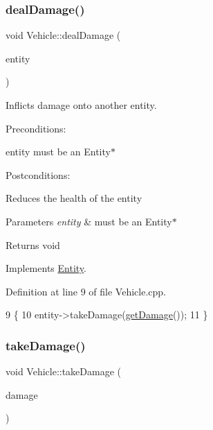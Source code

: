 \subsubsection{\texorpdfstring{deal\+Damage()}{dealDamage()}}
{\footnotesize\ttfamily void Vehicle\+::deal\+Damage (\begin{DoxyParamCaption}\item[{\hyperlink{classEntity}{Entity} $\ast$}]{entity }\end{DoxyParamCaption})\hspace{0.3cm}{\ttfamily [virtual]}}



Inflicts damage onto another entity. 

Preconditions\+:
\begin{DoxyItemize}
\item entity must be an Entity$\ast$
\end{DoxyItemize}

Postconditions\+:
\begin{DoxyItemize}
\item Reduces the health of the entity
\end{DoxyItemize}


\begin{DoxyParams}{Parameters}
{\em entity} & must be an Entity$\ast$ \\
\hline
\end{DoxyParams}
\begin{DoxyReturn}{Returns}
void 
\end{DoxyReturn}


Implements \hyperlink{classEntity}{Entity}.



Definition at line 9 of file Vehicle.\+cpp.


\begin{DoxyCode}
9                                        \{
10     entity->takeDamage(\hyperlink{classEntity_ad38d4384aa0adef43443666a33f06508}{getDamage}());
11 \}
\end{DoxyCode}
\mbox{\label{classVehicle_ae30a3d13e4d254993acf808a94fdff8d}} 
\subsubsection{\texorpdfstring{take\+Damage()}{takeDamage()}}
{\footnotesize\ttfamily void Vehicle\+::take\+Damage (\begin{DoxyParamCaption}\item[{int}]{damage }\end{DoxyParamCaption})\hspace{0.3cm}{\ttfamily [virtual]}}



